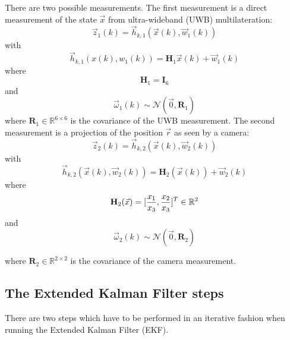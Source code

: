 There are two possible measurements. The first measurement is a direct measurement of the state $\vec x$ from ultra-wideband (UWB) multilateration:
\begin{equation}
	\vec z_1(k) = \vec h_{k,1}(\vec x(k), \vec w_1(k))
\end{equation}
with
\begin{equation}
  \vec h_{k,1}(x(k), w_1(k)) = \textbf{H}_1 \vec x(k) + \vec w_1(k)
\end{equation}
where
$$\textbf{H}_1 = \textbf{I}_6$$
and
$$\vec \omega_1(k) \sim \mathcal{N}(\vec 0, \textbf{R}_1)$$
where $\textbf{R}_1 \in \mathbb{R}^{6\times6}$ is the covariance of the UWB measurement.
The second measurement is a projection of the position $\vec r$ as seen by a camera:
\begin{equation}
	\vec z_2(k) = \vec h_{k,2}(\vec x(k), \vec w_2(k))
\end{equation}
with
\begin{equation}
  \vec h_{k,2}(\vec x(k), \vec w_2(k)) = \textbf{H}_2(\vec x(k)) + \vec w_2(k)
\end{equation}
where
\begin{equation}
	\textbf{H}_2(\vec x) = [\frac{x_1}{x_3}, \frac{x_2}{x_3}]^T \in \mathbb{R}^2\\
\end{equation}
and
\begin{equation}
  \vec \omega_2(k) \sim \mathcal{N}(\vec 0, \textbf{R}_2)
\end{equation}

where $\textbf{R}_2 \in \mathbb{R}^{2\times2}$ is the covariance of the camera measurement.

\subsection{The Extended Kalman Filter steps}
There are two steps which have to be performed in an iterative fashion when running the Extended Kalman Filter (EKF).

